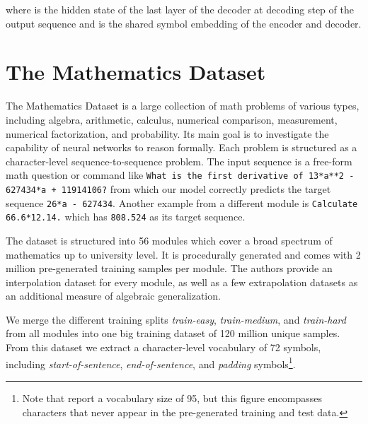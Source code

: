 \documentclass[11pt,a4paper]{article}
\begin{document}
where  is the hidden state of the last layer of the decoder at decoding step  of the output sequence and  is the shared symbol embedding of the encoder and decoder.

\section{The Mathematics Dataset}  \label{sec:Data}
The Mathematics Dataset \citep{saxton2018analysing} is a large collection of math problems of various types, including algebra, arithmetic, calculus, numerical comparison, measurement, numerical factorization, and probability.
Its main goal is to investigate the capability of neural networks to reason formally. 
Each problem is structured as a character-level sequence-to-sequence problem. 
The input sequence is a free-form math question or command like \texttt{What is the first derivative of 13*a**2 - 627434*a + 11914106?} from which our model correctly predicts the target sequence \texttt{26*a - 627434}.
Another example from a different module is \texttt{Calculate 66.6*12.14.} which has \texttt{808.524} as its target sequence.

The dataset is structured into 56 modules which cover a broad spectrum of mathematics up to university level.
It is procedurally generated and comes with 2 million pre-generated training samples per module.
The authors provide an interpolation dataset for every module, as well as a few extrapolation datasets as an additional measure of algebraic generalization.

We merge the different training splits \textit{train-easy}, \textit{train-medium}, and \textit{train-hard} from all modules into one big training dataset of 120 million unique samples.
From this dataset we extract a character-level vocabulary of 72 symbols, including \textit{start-of-sentence},  \textit{end-of-sentence}, and \textit{padding} symbols\footnote{Note that \cite{saxton2018analysing} report a vocabulary size of 95, but this figure encompasses characters that never appear in the pre-generated training and test data.}.

\newcommand{\NameLSTM}{LSTM with thinking steps (Saxton et al.)}
\newcommand{\NameTFSaxton}{Transformer (Saxton et al.)}
\newcommand{\NameTF}{Transformer (ours)}
\newcommand{\NameTPTlarge}{TP-Transformer (ours)}
\newcommand{\NameTPTsmallA}{TP-Transformer B (ours)}
\newcommand{\NameTPTsmallB}{TP-Transformer C (ours)}
\end{document}
